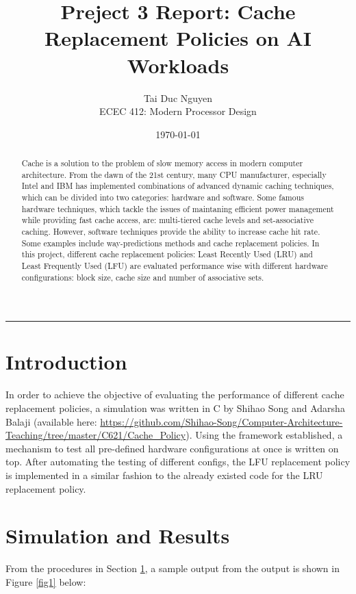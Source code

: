 \documentclass[letterpaper, 11pt]{article}
\title{Preject 3 Report: Cache Replacement Policies on AI Workloads}
\author{
Tai Duc Nguyen \\
ECEC 412: Modern Processor Design
}
\date{\today}
\begin{document}
\maketitle
\rule{\textwidth}{1pt}

\begin{abstract}
	Cache is a solution to the problem of slow memory access in modern computer architecture. From the dawn of the 21st century, many CPU manufacturer, especially Intel and IBM has implemented combinations of advanced dynamic caching techniques, which can be divided into two categories: hardware and software. Some famous hardware techniques, which tackle the issues of maintaning efficient power management while providing fast cache access, are: multi-tiered cache levels and set-associative caching. However, software techniques provide the ability to increase cache hit rate. Some examples include way-predictions methods and cache replacement policies. In this project, different cache replacement policies: Least Recently Used (LRU) and Least Frequently Used (LFU) are evaluated performance wise with different hardware configurations: block size, cache size and number of associative sets.
\end{abstract}

\section{Introduction}
\label{intro}
	In order to achieve the objective of evaluating the performance of different cache replacement policies, a simulation was written in C by Shihao Song and Adarsha Balaji (available here: \url{https://github.com/Shihao-Song/Computer-Architecture-Teaching/tree/master/C621/Cache_Policy}). Using the framework established, a mechanism to test all pre-defined hardware configurations at once is written on top. After automating the testing of different configs, the LFU replacement policy is implemented in a similar fashion to the already existed code for the LRU replacement policy.

\section{Simulation and Results}
	From the procedures in Section \ref{intro}, a sample output from the output is shown in Figure \ref{fig1} below:
	
\end{document}
